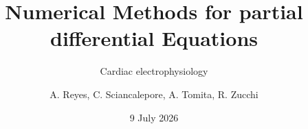 \documentclass{beamer}
\title{Numerical Methods for partial differential Equations}
\subtitle{Cardiac electrophysiology}
\author{A. Reyes, C. Sciancalepore, A. Tomita, R. Zucchi}
\date{9 July 2026}
\begin{document}
    \begin{frame}
        \maketitle
    \end{frame}


    
    
    
    
    
\end{document}
